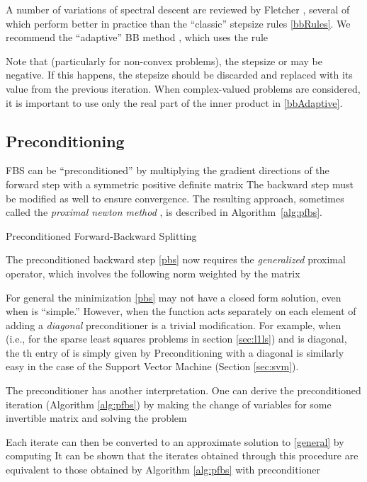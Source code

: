 \documentclass{amsart}
\newcommand{\half}{\frac{1}{2}}
\newcommand{\eqn}[2]{}
\newcommand{\css}[1]{\begin{cases}#1\end{cases}}
\DeclareMathOperator*{\minimize}{minimize\quad}
\theoremstyle{definition}
\begin{document}
A number of variations of spectral descent are reviewed by Fletcher \cite{Fletcher05}, several of which perform better in practice than the ``classic'' stepsize rules \eqref{bbRules}.  We recommend the ``adaptive'' BB method \cite{ZGD06},  which uses the rule
        \eqn{bbAdaptive}{ \tau^k=
    \css{
      \tau_m^k & \text{ if } \tau_m^k/\tau_s^k >\half \\
       \tau_s^k - \half  \tau_m^k & \text{ otherwise.}  
    }
    }
   Note that (particularly for non-convex problems), the stepsize  or  may be negative.  If this happens, the stepsize should be discarded and replaced with its value from the previous iteration.  When complex-valued problems are considered, it is important to use only the real part of the inner product in \eqref{bbAdaptive}.

\subsection{Preconditioning}



FBS can be ``preconditioned'' by multiplying the gradient directions of the forward step with a symmetric positive definite matrix   The backward step must be modified as well to ensure convergence.  The resulting approach, sometimes called the {\em proximal newton method} \cite{Bertsekas82, LSS12}, is described in Algorithm~\ref{alg:pfbs}.  
\begin{algorithm}[H]
\begin{algorithmic}
 
\EndWhile
\end{algorithmic}
\caption{Preconditioned Forward-Backward Splitting}
\label{alg:pfbs}
\end{algorithm} 
The preconditioned backward step \eqref{pbs} now requires the {\em generalized} proximal operator, which involves the following norm weighted by the matrix 
  
For general  the minimization \eqref{pbs} may not have a closed form solution, even when  is ``simple.''  However, when the function  acts separately on each element of  adding a {\em diagonal} preconditioner is a trivial modification.   For example, when   (i.e., for the sparse least squares problems in section \ref{sec:l1ls}) and  is diagonal, the th entry of  is simply given by   Preconditioning with a diagonal  is similarly easy in the case of the Support Vector Machine (Section \ref{sec:svm}).

   The preconditioner has another interpretation.  One can derive the preconditioned iteration (Algorithm \ref{alg:pfbs}) by making the change of variables  for some invertible matrix  and solving the problem 
     \eqn{precon}{\minimize_y f(Py)+g(Py).}
Each iterate  can then be converted to an approximate solution to \eqref{general} by computing  It can be shown that the iterates  obtained through this procedure are equivalent to those obtained by Algorithm \ref{alg:pfbs} with preconditioner  
\end{document}
